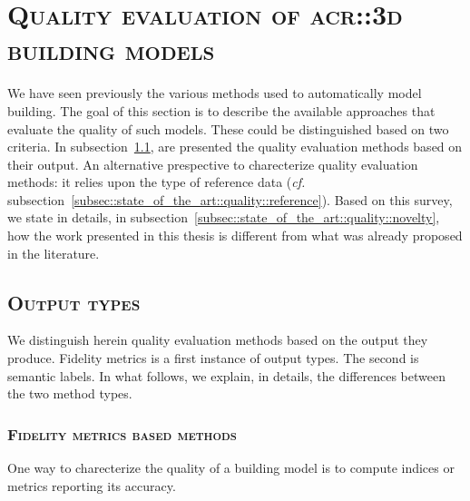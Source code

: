 \section{\textsc{Quality evaluation of \texorpdfstring{\gls*{acr::3d}}{3D} building models}}
    \label{sec::state_of_the_art::quality}
    We have seen previously the various methods used to automatically model building.
    The goal of this section is to describe the available approaches that evaluate the quality of such models.
    These could be distinguished based on two criteria.
    In subsection~\ref{subsec::state_of_the_art::quality::output}, are presented the quality evaluation methods based on their output.
    An alternative prespective to charecterize quality evaluation methods: it relies upon the type of reference data (\textit{cf.} subsection~\ref{subsec::state_of_the_art::quality::reference}).
    Based on this survey, we state in details, in subsection~\ref{subsec::state_of_the_art::quality::novelty}, how the work presented in this thesis is different from what was already proposed in the literature. 

    \subsection{\textsc{Output types}}
        \label{subsec::state_of_the_art::quality::output}
        We distinguish herein quality evaluation methods based on the output they produce.
        Fidelity metrics is a first instance of output types.
        The second is semantic labels.
        In what follows, we explain, in details, the differences between the two method types.

        \subsubsection{\textsc{Fidelity metrics based methods}}
            One way to charecterize the quality of a building model is to compute indices or metrics reporting its accuracy.\\

